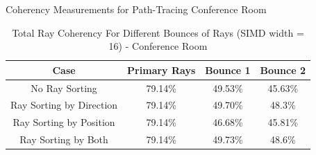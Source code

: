 \documentclass{beamer}
\begin{document}
\begin{frame}{Coherency Measurements for Path-Tracing Conference Room}
	\begin{table}[ht]  
		\centering %
		\begin{tabular}{c c c c} %
			\hline %
			
			Case & Primary Rays & Bounce 1 & Bounce 2 \\ [0.5ex] %
			
			\hline %
			No Ray Sorting &  79.14\% & 49.53\% & 45.63\% \\ %
			Ray Sorting by Direction & 79.14\% & 49.70\% & 48.3\% \\ 
			Ray Sorting by Position &    79.14\% & 46.68\%  & 45.81\% \\ 
			Ray Sorting by Both & 79.14\% & 49.73\% & 48.6\% \\ [1ex]
			\hline %
		\end{tabular} 
	\caption{Total Ray Coherency For Different Bounces of Rays (SIMD width = 16) - Conference Room} %
		\label{table:ConfRenderCoh} %
	\end{table} 
\end{frame}
\end{document}
